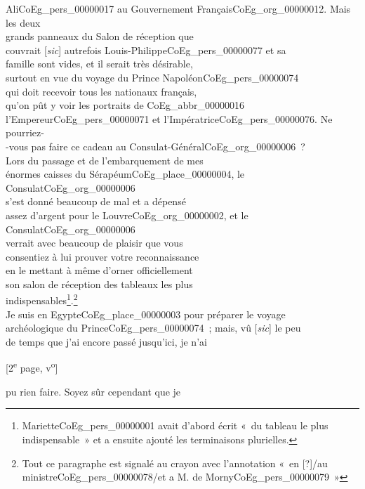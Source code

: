 \documentclass{book}
\begin{document}
{Ali\gls{CoEg_pers_00000017} au Gouvernement Français\gls{CoEg_org_00000012}. Mais les deux\\
grands panneaux du Salon de réception que\\
couvrait {[\textit{sic}]} autrefois Louis-Philippe\gls{CoEg_pers_00000077} et sa\\
famille sont vides, et il serait très désirable,\\
surtout en vue du voyage du Prince Napoléon\gls{CoEg_pers_00000074}\\
qui doit recevoir tous les nationaux français,\\
qu’on pût y voir les portraits de \gls{CoEg_abbr_00000016}\\
l’Empereur\gls{CoEg_pers_00000071} et l’Impératrice\gls{CoEg_pers_00000076}. Ne pourriez-\\
-vous pas faire ce cadeau au Consulat-Général\gls{CoEg_org_00000006}~?\\
\indent Lors du passage et de l’embarquement de mes\\
énormes caisses du Sérapéum\gls{CoEg_place_00000004}, le Consulat\gls{CoEg_org_00000006}\\
s’est donné beaucoup de mal et a dépensé\\
assez d’argent pour le Louvre\gls{CoEg_org_00000002}, et le Consulat\gls{CoEg_org_00000006}\\
verrait avec beaucoup de plaisir que vous\\
consentiez à lui prouver votre reconnaissance\\
en le mettant à même d’orner officiellement\\
son salon de réception des tableaux les plus\\
indispensables\footnote{Mariette\gls{CoEg_pers_00000001} avait d'abord écrit «~du tableau le plus indispensable~» et a ensuite ajouté les terminaisons plurielles.}.\footnote{Tout ce paragraphe est signalé au crayon avec l'annotation «~en [?]/au ministre\gls{CoEg_pers_00000078}/et a M. de Morny\gls{CoEg_pers_00000079}~»}\\
\indent Je suis en Egypte\gls{CoEg_place_00000003} pour préparer le voyage\\
archéologique du Prince\gls{CoEg_pers_00000074}~; mais, vû {[\textit{sic}]} le peu\\
de temps que j’ai encore passé jusqu’ici, je n’ai
{\footnotesize\begin{center} {[2\textsuperscript{e} page, v\textsuperscript{o}]}\end{center}}
\noindent pu rien faire. Soyez sûr cependant que je\\
}
\end{document}
